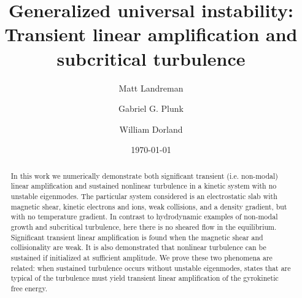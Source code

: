 \documentclass[12pt,superscriptaddress]{revtex4}
\begin{document}
\title{Generalized universal instability: Transient linear amplification and subcritical turbulence}




\author{Matt Landreman}
\author{Gabriel G. Plunk}
\author{William Dorland}


\date{\today}

\begin{abstract}

In this work we numerically demonstrate both significant transient (i.e. non-modal) linear amplification
and sustained nonlinear turbulence
in a kinetic system with no unstable eigenmodes.
The particular system considered is an electrostatic slab
with magnetic shear, kinetic electrons and ions,
weak collisions,
and a density gradient, but with no temperature gradient.
In contrast to hydrodynamic examples of non-modal growth and subcritical turbulence,
here there is no sheared flow in the equilibrium.
Significant transient linear amplification
is found when the magnetic shear and collisionality are weak.
It is also demonstrated that nonlinear turbulence can be sustained if initialized
at sufficient amplitude.
We prove these two phenomena are related:
when sustained turbulence occurs without unstable eigenmodes,
states that are typical of the turbulence must
yield transient linear amplification of the gyrokinetic free energy.

\end{abstract}
\end{document}
